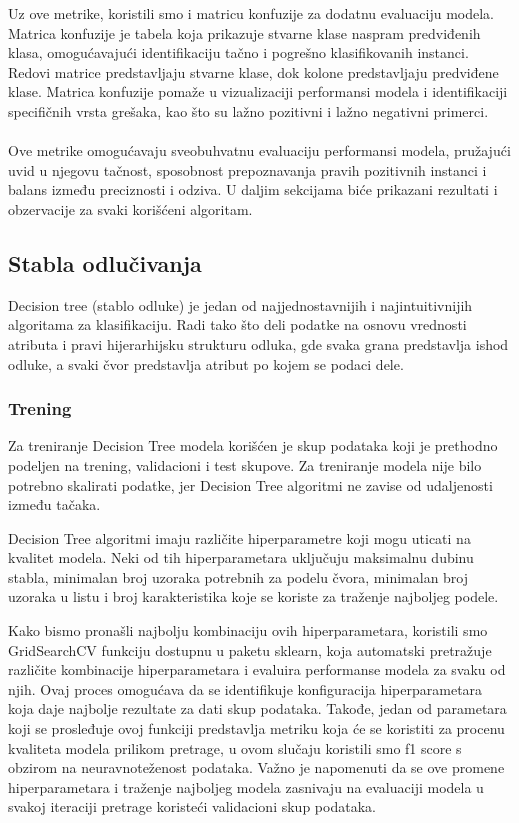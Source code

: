 \documentclass[a4paper,12pt]{article}
\begin{document}
Uz ove metrike, koristili smo i matricu konfuzije za dodatnu evaluaciju modela. Matrica konfuzije je tabela koja prikazuje stvarne klase naspram predviđenih klasa, omogućavajući identifikaciju tačno i pogrešno klasifikovanih instanci. Redovi matrice predstavljaju stvarne klase, dok kolone predstavljaju predviđene klase. Matrica konfuzije pomaže u vizualizaciji performansi modela i identifikaciji specifičnih vrsta grešaka, kao što su lažno pozitivni i lažno negativni primerci.\\\\
Ove metrike omogućavaju sveobuhvatnu evaluaciju performansi modela, pružajući uvid u njegovu tačnost, sposobnost prepoznavanja pravih pozitivnih instanci i balans između preciznosti i odziva. U daljim sekcijama biće prikazani rezultati i obzervacije za svaki korišćeni algoritam.


\clearpage

\subsection{Stabla odlučivanja}
Decision tree (stablo odluke) je jedan od najjednostavnijih i najintuitivnijih algoritama za klasifikaciju. Radi tako što deli podatke na osnovu vrednosti atributa i pravi hijerarhijsku strukturu odluka, gde svaka grana predstavlja ishod odluke, a svaki čvor predstavlja atribut po kojem se podaci dele.


\subsubsection{Trening}

Za treniranje Decision Tree modela korišćen je skup podataka koji je prethodno podeljen na trening, validacioni i test skupove. Za treniranje modela nije bilo potrebno skalirati podatke, jer Decision Tree algoritmi ne zavise od udaljenosti između tačaka.

Decision Tree algoritmi imaju različite hiperparametre koji mogu uticati na kvalitet modela. Neki od tih hiperparametara uključuju maksimalnu dubinu stabla, minimalan broj uzoraka potrebnih za podelu čvora, minimalan broj uzoraka u listu i broj karakteristika koje se koriste za traženje najboljeg podele.

Kako bismo pronašli najbolju kombinaciju ovih hiperparametara, koristili smo GridSearchCV funkciju dostupnu u paketu sklearn, koja automatski pretražuje različite kombinacije hiperparametara i evaluira performanse modela za svaku od njih. Ovaj proces omogućava da se identifikuje konfiguracija hiperparametara koja daje najbolje rezultate za dati skup podataka. Takođe, jedan od parametara koji se prosleđuje ovoj funkciji predstavlja metriku koja će se koristiti za procenu kvaliteta modela prilikom pretrage, u ovom slučaju koristili smo f1 score s obzirom na neuravnoteženost podataka. Važno je napomenuti da se ove promene hiperparametara i traženje najboljeg modela zasnivaju na evaluaciji modela u svakoj iteraciji pretrage koristeći validacioni skup podataka.
\end{document}
